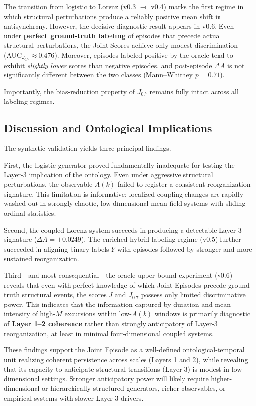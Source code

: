 The transition from logistic to Lorenz (v0.3 \(\to\) v0.4) marks the first regime in which structural perturbations produce a reliably positive mean shift in antisynchrony. However, the decisive diagnostic result appears in v0.6. Even under \textbf{perfect ground-truth labeling} of episodes that precede actual structural perturbations, the Joint Scores achieve only modest discrimination (AUC\(_{J_{0.7}} \approx 0.476\)). Moreover, episodes labeled positive by the oracle tend to exhibit \textit{slightly lower} scores than negative episodes, and post-episode \(\Delta A\) is not significantly different between the two classes (Mann--Whitney \(p = 0.71\)).

Importantly, the bias-reduction property of \(J_{0.7}\) remains fully intact across all labeling regimes.

\subsection{Discussion and Ontological Implications}

The synthetic validation yields three principal findings.

First, the logistic generator proved fundamentally inadequate for testing the Layer-3 implication of the ontology. Even under aggressive structural perturbations, the observable \(A(k)\) failed to register a consistent reorganization signature. This limitation is informative: localized coupling changes are rapidly washed out in strongly chaotic, low-dimensional mean-field systems with sliding ordinal statistics.

Second, the coupled Lorenz system succeeds in producing a detectable Layer-3 signature (\(\Delta A = +0.0249\)). The enriched hybrid labeling regime (v0.5) further succeeded in aligning binary labels \(Y\) with episodes followed by stronger and more sustained reorganization.

Third---and most consequential---the oracle upper-bound experiment (v0.6) reveals that even with perfect knowledge of which Joint Episodes precede ground-truth structural events, the scores \(J\) and \(J_{0.7}\) possess only limited discriminative power. This indicates that the information captured by duration and mean intensity of high-\(M\) excursions within low-\(A(k)\) windows is primarily diagnostic of \textbf{Layer 1--2 coherence} rather than strongly anticipatory of Layer-3 reorganization, at least in minimal four-dimensional coupled systems.

These findings support the Joint Episode as a well-defined ontological-temporal unit realizing coherent persistence across scales (Layers 1 and 2), while revealing that its capacity to anticipate structural transitions (Layer 3) is modest in low-dimensional settings. Stronger anticipatory power will likely require higher-dimensional or hierarchically structured generators, richer observables, or empirical systems with slower Layer-3 drivers.

